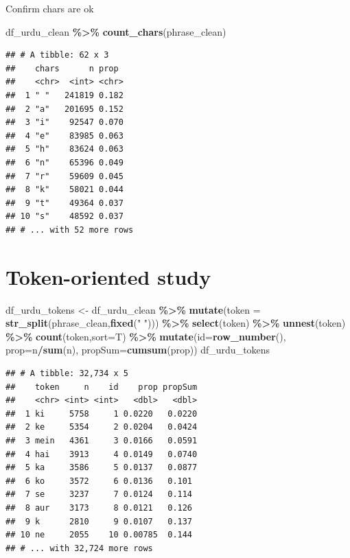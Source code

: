 \documentclass[
]{article}
\newenvironment{Shaded}{\begin{snugshade}}{\end{snugshade}}
\newcommand{\DataTypeTok}[1]{\textcolor[rgb]{0.13,0.29,0.53}{#1}}
\newcommand{\KeywordTok}[1]{\textcolor[rgb]{0.13,0.29,0.53}{\textbf{#1}}}
\newcommand{\NormalTok}[1]{#1}
\newcommand{\OperatorTok}[1]{\textcolor[rgb]{0.81,0.36,0.00}{\textbf{#1}}}
\newcommand{\StringTok}[1]{\textcolor[rgb]{0.31,0.60,0.02}{#1}}
\begin{document}
Confirm chars are ok

\begin{Shaded}
\begin{Highlighting}[]
\NormalTok{df\_urdu\_clean }\OperatorTok{\%\textgreater{}\%}\StringTok{ }\KeywordTok{count\_chars}\NormalTok{(phrase\_clean)}
\end{Highlighting}
\end{Shaded}

\begin{verbatim}
## # A tibble: 62 x 3
##    chars      n prop 
##    <chr>  <int> <chr>
##  1 " "   241819 0.182
##  2 "a"   201695 0.152
##  3 "i"    92547 0.070
##  4 "e"    83985 0.063
##  5 "h"    83624 0.063
##  6 "n"    65396 0.049
##  7 "r"    59609 0.045
##  8 "k"    58021 0.044
##  9 "t"    49364 0.037
## 10 "s"    48592 0.037
## # ... with 52 more rows
\end{verbatim}

\hypertarget{token-oriented-study}{%
\section{Token-oriented study}\label{token-oriented-study}}

\begin{Shaded}
\begin{Highlighting}[]
\NormalTok{df\_urdu\_tokens \textless{}{-}}\StringTok{ }\NormalTok{df\_urdu\_clean }\OperatorTok{\%\textgreater{}\%}
\StringTok{  }\KeywordTok{mutate}\NormalTok{(}\DataTypeTok{token =} \KeywordTok{str\_split}\NormalTok{(phrase\_clean,}\KeywordTok{fixed}\NormalTok{(}\StringTok{" "}\NormalTok{))) }\OperatorTok{\%\textgreater{}\%}
\StringTok{  }\KeywordTok{select}\NormalTok{(token) }\OperatorTok{\%\textgreater{}\%}
\StringTok{  }\KeywordTok{unnest}\NormalTok{(token) }\OperatorTok{\%\textgreater{}\%}
\StringTok{  }\KeywordTok{count}\NormalTok{(token,}\DataTypeTok{sort=}\NormalTok{T) }\OperatorTok{\%\textgreater{}\%}
\StringTok{  }\KeywordTok{mutate}\NormalTok{(}\DataTypeTok{id=}\KeywordTok{row\_number}\NormalTok{(),}
         \DataTypeTok{prop=}\NormalTok{n}\OperatorTok{/}\KeywordTok{sum}\NormalTok{(n),}
         \DataTypeTok{propSum=}\KeywordTok{cumsum}\NormalTok{(prop))}
\NormalTok{df\_urdu\_tokens}
\end{Highlighting}
\end{Shaded}

\begin{verbatim}
## # A tibble: 32,734 x 5
##    token     n    id    prop propSum
##    <chr> <int> <int>   <dbl>   <dbl>
##  1 ki     5758     1 0.0220   0.0220
##  2 ke     5354     2 0.0204   0.0424
##  3 mein   4361     3 0.0166   0.0591
##  4 hai    3913     4 0.0149   0.0740
##  5 ka     3586     5 0.0137   0.0877
##  6 ko     3572     6 0.0136   0.101 
##  7 se     3237     7 0.0124   0.114 
##  8 aur    3173     8 0.0121   0.126 
##  9 k      2810     9 0.0107   0.137 
## 10 ne     2055    10 0.00785  0.144 
## # ... with 32,724 more rows
\end{verbatim}
\end{document}
